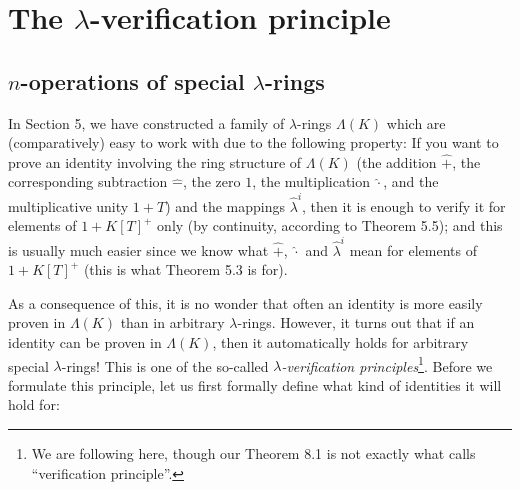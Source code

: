 \documentclass[numbers=enddot,12pt,final,onecolumn,notitlepage]{scrartcl}%
\begin{document}
\section{The $\lambda$-verification principle}

\subsection{$n$-operations of special $\lambda$-rings}

In Section 5, we have constructed a family of $\lambda$-rings $\Lambda\left(
K\right)  $ which are (comparatively) easy to work with due to the following
property: If you want to prove an identity involving the ring structure of
$\Lambda\left(  K\right)  $ (the addition $\widehat{+}$, the corresponding
subtraction $\widehat{-}$, the zero $1$, the multiplication $\widehat{\cdot}$,
and the multiplicative unity $1+T$) and the mappings $\widehat{\lambda}^{i}$,
then it is enough to verify it for elements of $1+K\left[  T\right]  ^{+}$
only (by continuity, according to Theorem 5.5); and this is usually much
easier since we know what $\widehat{+}$, $\widehat{\cdot}$ and
$\widehat{\lambda}^{i}$ mean for elements of $1+K\left[  T\right]  ^{+}$ (this
is what Theorem 5.3 is for).

As a consequence of this, it is no wonder that often an identity is more
easily proven in $\Lambda\left(  K\right)  $ than in arbitrary $\lambda
$-rings. However, it turns out that if an identity can be proven in
$\Lambda\left(  K\right)  $, then it automatically holds for arbitrary special
$\lambda$-rings! This is one of the so-called $\lambda$\textit{-verification
principles}\footnote{We are following \cite[pp. 25--27]{Knut73} here, though
our Theorem 8.1 is not exactly what \cite{Knut73} calls ``verification
principle''.}. Before we formulate this principle, let us first formally
define what kind of identities it will hold for:
\end{document}
